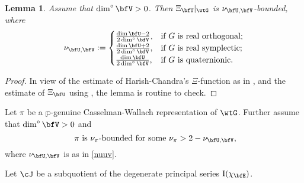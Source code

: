 \documentclass[12pt,a4paper]{amsart}
\newcommand{\RI}{{\mathrm {I}}}
\numberwithin{equation}{section}
\newtheorem{lem}[thm]{Lemma}
\theoremstyle{remark}
\def\dimo{\dim^\circ}
\begin{document}
\begin{lem}\label{boundxi}
  Assume that $\dimo \bfV>0$. Then $\Xi_{\bfU}|_{\wtG}$ is
  $\nu_{\bfU,\bfV}$-bounded, where
  \begin{equation}
    \label{nuuv}
    \nu_{\bfU,\bfV}:=
    \begin{cases}
      \frac{\dim \bfU-2}{2\dimo \bfV},&\hbox{if $G$ is real orthogonal;}\\
      \frac{\dim \bfU+2}{2\dimo \bfV}, &\hbox{if $G$ is real  symplectic;} \\
      \frac{\dim \bfU}{2\dimo \bfV}, &\hbox{if $G$ is quaternionic.}
    \end{cases}
  \end{equation}
\end{lem}
\begin{proof}
  In view of the estimate of Harish-Chandra's $\Xi$-function as in \cite[Theorem
  4.5.3]{Wa1}, and the estimate of $\Xi_{\bfU}$ using \cite[Corollary
  3.6.8]{Wa1}, the lemma is routine to
  check.%
\end{proof}


Let $\pi$ be a $\mathbb p$-genuine Casselman-Wallach representation of
$\wtG$. Further assume that $\dimo \bfV>0 $ and
\begin{equation}\label{bnuv}
  \textrm{
    $\pi$ is $\nu_\pi$-bounded for some $\nu_\pi>2-\nu_{\bfU,\bfV}$,}
\end{equation}
where $\nu_{\bfU,\bfV}$ is as in \eqref{nuuv}.

Let $\cJ$ be a subquotient of the degenerate principal series
$\RI(\chi_{\bfE})$.
\end{document}
